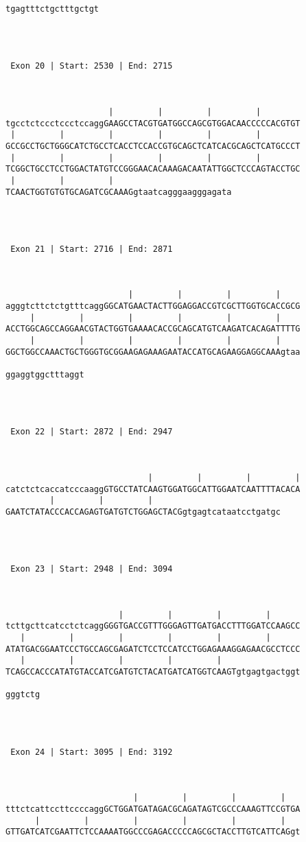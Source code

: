 \documentclass{article}
\begin{document}
\begin{Verbatim}
tgagtttctgctttgctgt




 Exon 20 | Start: 2530 | End: 2715 



                     |         |         |         |        
tgcctctccctccctccaggGAAGCCTACGTGATGGCCAGCGTGGACAACCCCCACGTGT
 |         |         |         |         |         |        
GCCGCCTGCTGGGCATCTGCCTCACCTCCACCGTGCAGCTCATCACGCAGCTCATGCCCT
 |         |         |         |         |         |        
TCGGCTGCCTCCTGGACTATGTCCGGGAACACAAAGACAATATTGGCTCCCAGTACCTGC
 |         |         |                        
TCAACTGGTGTGTGCAGATCGCAAAGgtaatcagggaagggagata




 Exon 21 | Start: 2716 | End: 2871 



                         |         |         |         |    
agggtcttctctgtttcaggGGCATGAACTACTTGGAGGACCGTCGCTTGGTGCACCGCG
     |         |         |         |         |         |    
ACCTGGCAGCCAGGAACGTACTGGTGAAAACACCGCAGCATGTCAAGATCACAGATTTTG
     |         |         |         |         |         |    
GGCTGGCCAAACTGCTGGGTGCGGAAGAGAAAGAATACCATGCAGAAGGAGGCAAAgtaa
                
ggaggtggctttaggt




 Exon 22 | Start: 2872 | End: 2947 



                             |         |         |         |
catctctcaccatcccaaggGTGCCTATCAAGTGGATGGCATTGGAATCAATTTTACACA
         |         |         |                          
GAATCTATACCCACCAGAGTGATGTCTGGAGCTACGgtgagtcataatcctgatgc




 Exon 23 | Start: 2948 | End: 3094 



                       |         |         |         |      
tcttgcttcatcctctcaggGGGTGACCGTTTGGGAGTTGATGACCTTTGGATCCAAGCC
   |         |         |         |         |         |      
ATATGACGGAATCCCTGCCAGCGAGATCTCCTCCATCCTGGAGAAAGGAGAACGCCTCCC
   |         |         |         |         |                
TCAGCCACCCATATGTACCATCGATGTCTACATGATCATGGTCAAGTgtgagtgactggt
       
gggtctg




 Exon 24 | Start: 3095 | End: 3192 



                          |         |         |         |   
tttctcattccttccccaggGCTGGATGATAGACGCAGATAGTCGCCCAAAGTTCCGTGA
      |         |         |         |         |         |   
GTTGATCATCGAATTCTCCAAAATGGCCCGAGACCCCCAGCGCTACCTTGTCATTCAGgt
                  

\end{Verbatim}
\end{document}
